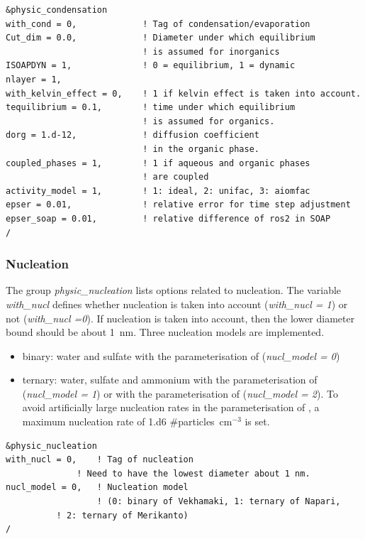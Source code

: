 \documentclass[a4paper,11pt]{article}
\begin{document}
\begin{verbatim}
&physic_condensation
with_cond = 0,             ! Tag of condensation/evaporation
Cut_dim = 0.0,             ! Diameter under which equilibrium
                           ! is assumed for inorganics
ISOAPDYN = 1,              ! 0 = equilibrium, 1 = dynamic
nlayer = 1,
with_kelvin_effect = 0,    ! 1 if kelvin effect is taken into account.
tequilibrium = 0.1,        ! time under which equilibrium 
                           ! is assumed for organics.
dorg = 1.d-12,             ! diffusion coefficient 
                           ! in the organic phase.
coupled_phases = 1,        ! 1 if aqueous and organic phases 
                           ! are coupled
activity_model = 1,        ! 1: ideal, 2: unifac, 3: aiomfac
epser = 0.01,              ! relative error for time step adjustment
epser_soap = 0.01,         ! relative difference of ros2 in SOAP  
/

\end{verbatim}

\subsubsection{Nucleation}


The group {\textit{physic\_nucleation}} lists options related to nucleation. The variable {\textit{with\_nucl}} defines whether nucleation is taken into account ({\textit{with\_nucl = 1}}) or not ({\textit{with\_nucl =0}}). If nucleation is taken into account, then the lower diameter bound should be about 1~nm. Three nucleation models are implemented.
\begin{itemize}
\item binary: water and sulfate with the parameterisation of \cite{vehk} ({\textit{nucl\_model = 0}})
\item ternary: water, sulfate and ammonium with the parameterisation of \cite{napari} ({\textit{nucl\_model = 1}}) or with the parameterisation of \cite{merikantoa, merikantob} ({\textit{nucl\_model = 2}}).
To avoid artificially large nucleation rates in the parameterisation of \cite{napari}, a maximum nucleation rate of 1.d6 \#particles~cm$^{-3}$ is set.
\end{itemize}


\begin{verbatim}
&physic_nucleation
with_nucl = 0,    ! Tag of nucleation 
	    	  ! Need to have the lowest diameter about 1 nm.
nucl_model = 0,   ! Nucleation model 
                  ! (0: binary of Vekhamaki, 1: ternary of Napari, 
		  ! 2: ternary of Merikanto)
/
\end{verbatim} 
\end{document}
